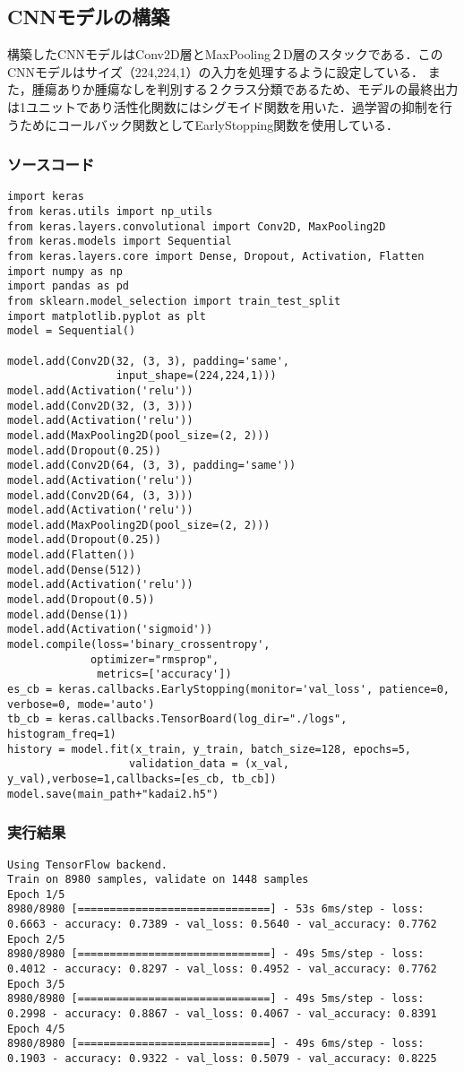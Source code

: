 \documentclass{article}
\begin{document}
\subsection{CNNモデルの構築}
構築したCNNモデルはConv2D層とMaxPooling２D層のスタックである．このCNNモデルはサイズ（224,224,1）の入力を処理するように設定している．
また，腫瘍ありか腫瘍なしを判別する２クラス分類であるため、モデルの最終出力は1ユニットであり活性化関数にはシグモイド関数を用いた．過学習の抑制を行うためにコールバック関数としてEarlyStopping関数を使用している．
\subsubsection{ソースコード}
\begin{lstlisting}
import keras
from keras.utils import np_utils
from keras.layers.convolutional import Conv2D, MaxPooling2D
from keras.models import Sequential
from keras.layers.core import Dense, Dropout, Activation, Flatten
import numpy as np
import pandas as pd
from sklearn.model_selection import train_test_split
import matplotlib.pyplot as plt
model = Sequential()

model.add(Conv2D(32, (3, 3), padding='same',
                 input_shape=(224,224,1)))
model.add(Activation('relu'))
model.add(Conv2D(32, (3, 3)))
model.add(Activation('relu'))
model.add(MaxPooling2D(pool_size=(2, 2)))
model.add(Dropout(0.25))
model.add(Conv2D(64, (3, 3), padding='same'))
model.add(Activation('relu'))
model.add(Conv2D(64, (3, 3)))
model.add(Activation('relu'))
model.add(MaxPooling2D(pool_size=(2, 2)))
model.add(Dropout(0.25))
model.add(Flatten())
model.add(Dense(512))
model.add(Activation('relu'))
model.add(Dropout(0.5))
model.add(Dense(1))      
model.add(Activation('sigmoid'))
model.compile(loss='binary_crossentropy',
             optimizer="rmsprop",
              metrics=['accuracy'])
es_cb = keras.callbacks.EarlyStopping(monitor='val_loss', patience=0, verbose=0, mode='auto')
tb_cb = keras.callbacks.TensorBoard(log_dir="./logs", histogram_freq=1)
history = model.fit(x_train, y_train, batch_size=128, epochs=5,
                   validation_data = (x_val, y_val),verbose=1,callbacks=[es_cb, tb_cb])
model.save(main_path+"kadai2.h5")
\end{lstlisting}
\subsubsection{実行結果}
\begin{lstlisting}
Using TensorFlow backend.
Train on 8980 samples, validate on 1448 samples
Epoch 1/5
8980/8980 [==============================] - 53s 6ms/step - loss: 0.6663 - accuracy: 0.7389 - val_loss: 0.5640 - val_accuracy: 0.7762
Epoch 2/5
8980/8980 [==============================] - 49s 5ms/step - loss: 0.4012 - accuracy: 0.8297 - val_loss: 0.4952 - val_accuracy: 0.7762
Epoch 3/5
8980/8980 [==============================] - 49s 5ms/step - loss: 0.2998 - accuracy: 0.8867 - val_loss: 0.4067 - val_accuracy: 0.8391
Epoch 4/5
8980/8980 [==============================] - 49s 6ms/step - loss: 0.1903 - accuracy: 0.9322 - val_loss: 0.5079 - val_accuracy: 0.8225
\end{lstlisting}
\end{document}
